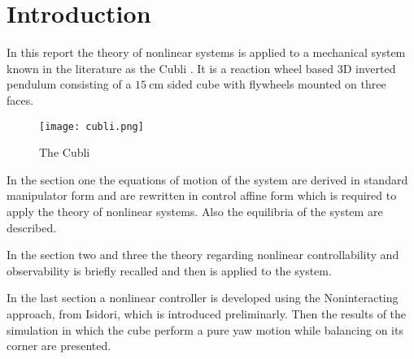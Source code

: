 \section*{Introduction}
In this report the theory of nonlinear systems is applied to a mechanical system known in the literature
as the Cubli \cite{Gajamohan2013}. It is a reaction wheel based 3D inverted pendulum consisting of a $\SI{15}{\centi\meter}$
sided cube with flywheels mounted on three faces.
\begin{figure}[h]
  \centering
  \texttt{[image: cubli.png]}
  \caption{The Cubli}
\end{figure}
\par
In the section one the equations of motion of the system are derived in standard manipulator form and are rewritten
in control affine form which is required to apply the theory of nonlinear systems. Also the equilibria of the system
are described.
\par
In the section two and three the theory regarding nonlinear controllability and observability is briefly recalled
and then is applied to the system.
\par
In the last section a nonlinear controller is developed using the Noninteracting approach, from Isidori, which is
introduced preliminarly. Then the results of the simulation in which the cube perform a pure yaw motion while balancing
on its corner are presented.

\newpage
